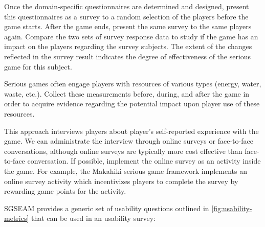 Once the domain-specific questionnaires are determined and designed, present this questionnaires as a 
survey to a random selection of the players before the game starts. After the game ends, present the same 
survey to the same players again. Compare the two sets of survey response data to study if the game has an 
impact on the players regarding the survey subjects. The extent of the changes reflected in the survey 
result indicates the degree of effectiveness of the serious game for this subject.

Serious games often engage players with resources of various types (energy, water, waste, etc.). Collect 
these measurements before, during, and after the game in order to acquire evidence regarding the potential 
impact upon player use of these resources.

\label{Self-reported usability survey}

This approach interviews players about player's self-reported experience with the game. We can administrate the interview through online surveys or face-to-face conversations, although online surveys are typically more 
cost effective than face-to-face conversation. If possible, implement the online survey as an activity inside the 
game. For example, the Makahiki serious game framework implements an online survey activity which 
incentivizes players to complete the survey by rewarding game points for the activity.

SGSEAM provides a generic set of usability questions outlined in \autoref{fig:usability-metrics} that can be used in an usability survey:\\

